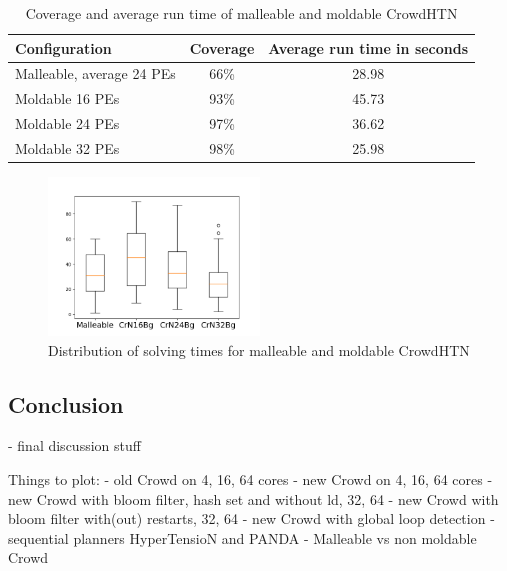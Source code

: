 \begin{table}
	\caption{Coverage and average run time of malleable and moldable CrowdHTN}
	\label{table: malleability}
	\centering
	
	\begin{tabular}{|l|c|c|}
		\hline
		Configuration & Coverage & Average run time in seconds \\
		\hline
		Malleable, average 24 PEs	& 66\%	& 28.98 \\
		Moldable 16 PEs				& 93\%  & 45.73 \\
		Moldable 24 PEs				& 97\%  & 36.62 \\
		Moldable 32 PEs				& 98\%  & 25.98 \\
		\hline
	\end{tabular}
\end{table}
\begin{figure}
	\caption{Distribution of solving times for malleable and moldable CrowdHTN}
	\label{figure: malleability}
	\centering
	\includegraphics[width=0.5\textwidth]{images/final/malleability}
\end{figure}

\subsection{Conclusion}
\label{eval: conclusion}
- final discussion stuff

Things to plot:
- old Crowd on 4, 16, 64 cores
- new Crowd on 4, 16, 64 cores
- new Crowd with bloom filter, hash set and without ld, 32, 64
- new Crowd with bloom filter with(out) restarts, 32, 64
- new Crowd with global loop detection
- sequential planners HyperTensioN and PANDA
- Malleable vs non moldable Crowd

